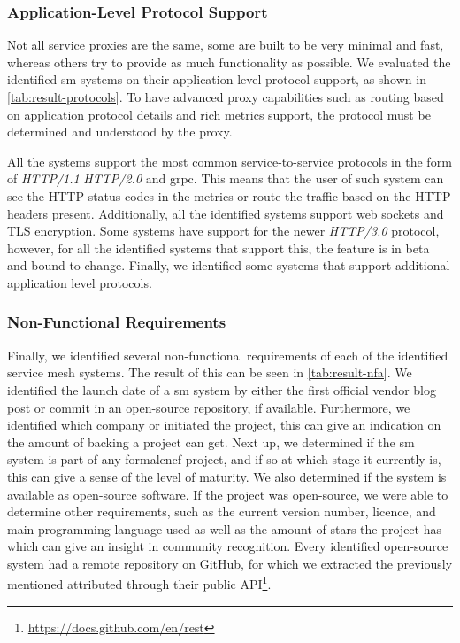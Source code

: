 \subsubsection{Application-Level Protocol Support}
\label{sec:survey:results:comparison:protocols}





Not all service proxies are the same, some are built to be very minimal and fast, whereas others try to provide as much functionality as possible. We evaluated the identified \gls{sm} systems on their application level protocol support, as shown in \cref{tab:result-protocols}. To have advanced proxy capabilities such as routing based on application protocol details and rich metrics support, the protocol must be determined and understood by the proxy. 

All the systems support the most common service-to-service protocols in the form of \textit{HTTP/1.1} \textit{HTTP/2.0} and \gls{grpc}. This means that the user of such system can see the HTTP status codes in the metrics or route the traffic based on the HTTP headers present. Additionally, all the identified systems support web sockets and TLS encryption. Some systems have support for the newer \textit{HTTP/3.0} protocol, however, for all the identified systems that support this, the feature is in beta and bound to change. Finally, we identified some systems that support additional application level protocols. 



\subsubsection{Non-Functional Requirements}
\label{sec:survey:results:comparison:nfr}



Finally, we identified several non-functional requirements of each of the identified service mesh systems. The result of this can be seen in \cref{tab:result-nfa}. We identified the launch date of a \gls{sm} system by either the first official vendor blog post or commit in an open-source repository, if available. Furthermore, we identified which company or initiated the project, this can give an indication on the amount of backing a project can get. Next up, we determined if the \gls{sm} system is part of any formal\gls{cncf} project, and if so at which stage it currently is, this can give a sense of the level of maturity. We also determined if the system is available as open-source software. If the project was open-source, we were able to determine other requirements, such as the current version number, licence, and main programming language used as well as the amount of stars the project has which can give an insight in community recognition. Every identified open-source system had a remote repository on GitHub, for which we extracted the previously mentioned attributed through their public API\footnote{\url{https://docs.github.com/en/rest}}.

